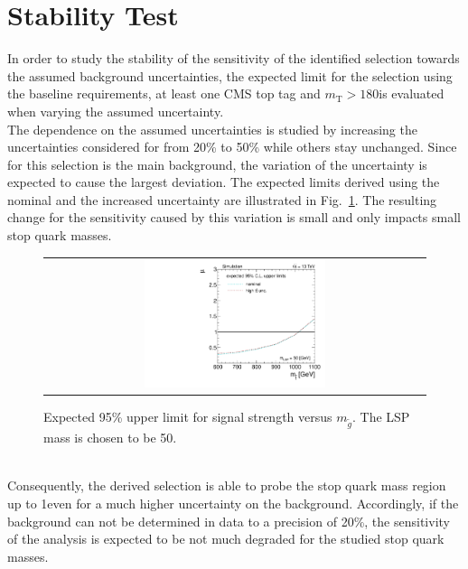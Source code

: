 
\section{Stability Test}
\label{sec:stop_syst}
In order to study the stability of the sensitivity of the identified selection towards the assumed background uncertainties, the expected limit for the selection using the baseline requirements, at least one CMS top tag and $m_\mathrm{T} > 180$\gev is evaluated when varying the assumed \ttbar uncertainty. \\
The dependence on the assumed uncertainties is studied by increasing the uncertainties considered for \ttbar from 20\% to 50\% while others stay unchanged. Since for this selection \ttbar is the main background, the variation of the \ttbar uncertainty is expected to cause the largest deviation. 
The expected limits derived using the nominal and the increased \ttbar uncertainty are illustrated in Fig.~\ref{fig:stop_varied_limit}. The resulting change for the sensitivity caused by this variation is small and only impacts small stop quark masses.      
\begin{figure}[!h]
  \centering
  \begin{tabular}{c}
                \includegraphics[width=0.49\textwidth]{figures/limitplot4BinSel_SystVariation_LSP50.pdf} 
  \end{tabular}
  \caption{Expected 95\% upper limit for signal strength versus $m_{\tilde{g}}$. The LSP mass is chosen to be 50\gev.}
  \label{fig:stop_varied_limit}
\end{figure}
\\
Consequently, the derived selection is able to probe the stop quark mass region up to 1\tev even for a much higher uncertainty on the \ttbar background. Accordingly, if the \ttbar background can not be determined in data to a precision of 20\%, the sensitivity of the analysis is expected to be not much degraded for the studied stop quark masses.              

